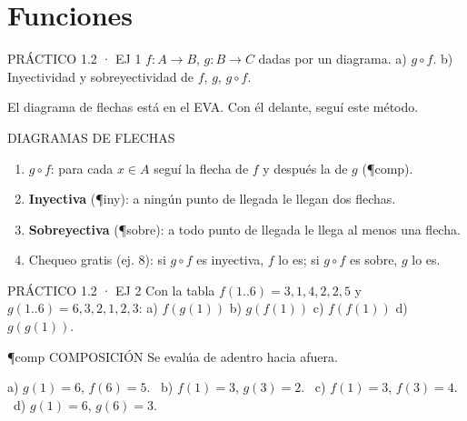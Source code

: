 \section{Funciones}

\begin{enunciado}{PRÁCTICO 1.2 · EJ 1}
$f:A\to B$, $g:B\to C$ dadas por un diagrama. a) $g\circ f$. b) Inyectividad y sobreyectividad de $f$, $g$, $g\circ f$.
\end{enunciado}
\begin{falta}
El diagrama de flechas está en el EVA. Con él delante, seguí este método.
\end{falta}
\begin{metodo}{DIAGRAMAS DE FLECHAS}
\begin{enumerate}
\item $g\circ f$: para cada $x\in A$ seguí la flecha de $f$ y después la de $g$ (\P{comp}).
\item \textbf{Inyectiva} (\P{iny}): a ningún punto de llegada le llegan dos flechas.
\item \textbf{Sobreyectiva} (\P{sobre}): a todo punto de llegada le llega al menos una flecha.
\item Chequeo gratis (ej. 8): si $g\circ f$ es inyectiva, $f$ lo es; si $g\circ f$ es sobre, $g$ lo es.
\end{enumerate}
\end{metodo}

\begin{enunciado}{PRÁCTICO 1.2 · EJ 2}
Con la tabla $f(1..6)=3,1,4,2,2,5$ y $g(1..6)=6,3,2,1,2,3$: a) $f(g(1))$ b) $g(f(1))$ c) $f(f(1))$ d) $g(g(1))$.
\end{enunciado}
\begin{uso}{\P{comp} COMPOSICIÓN}
Se evalúa de adentro hacia afuera.
\end{uso}
a) $g(1)=6$, $f(6)=5$. \ b) $f(1)=3$, $g(3)=2$. \ c) $f(1)=3$, $f(3)=4$. \ d) $g(1)=6$, $g(6)=3$.


